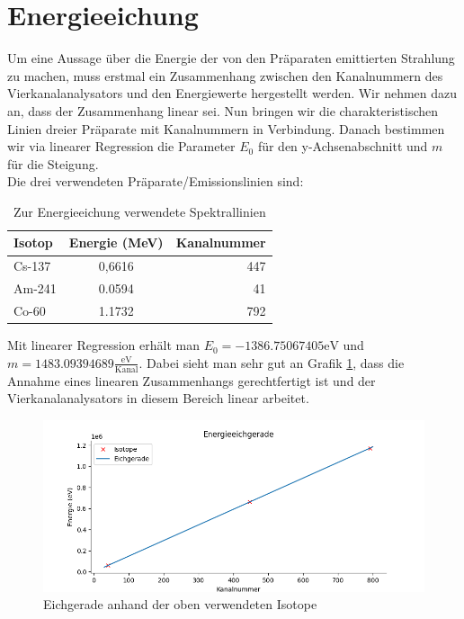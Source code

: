 \section{Energieeichung}
\label{section:Energieeichung}

Um eine Aussage über die Energie der von den Präparaten emittierten Strahlung zu machen, muss erstmal ein Zusammenhang zwischen 
den Kanalnummern des Vierkanalanalysators und den Energiewerte hergestellt werden. Wir nehmen dazu an, dass der Zusammenhang linear sei. Nun bringen wir 
die charakteristischen Linien dreier Präparate mit Kanalnummern in Verbindung. Danach bestimmen 
wir via linearer Regression die Parameter $E_0$  für den y-Achsenabschnitt und $m$ für die Steigung.\\

Die drei verwendeten Präparate/Emissionslinien  sind:
 \begin{table}[h]
    \centering
     \begin{tabular}{lcr}
        Isotop & Energie (MeV) & Kanalnummer \\
        \toprule
         Cs-137 & 0,6616  & 447\\
         Am-241 & 0.0594 & 41\\
         Co-60 & 1.1732 & 792\\
     \end{tabular}
     \caption{Zur Energieeichung verwendete Spektrallinien}
     \label{Eichung}
 \end{table}

 Mit linearer Regression erhält man $E_0 = -1386.75067405 \mathrm{ eV}$ und $m = 1483.09394689 \frac{\mathrm{eV}}{\mathrm{Kanal}}$.
 Dabei sieht man sehr gut an Grafik \ref{Eichgerade}, dass die Annahme eines linearen Zusammenhangs gerechtfertigt ist und der Vierkanalanalysators in 
 diesem Bereich linear arbeitet.

 \begin{figure}[ht]
     \centering
     \includegraphics[width = \linewidth]{Bilder/Auswertung/EnergieeichgeradeGamma.png}
     \caption{Eichgerade anhand der oben verwendeten Isotope}
     \label{Eichgerade}
 \end{figure}